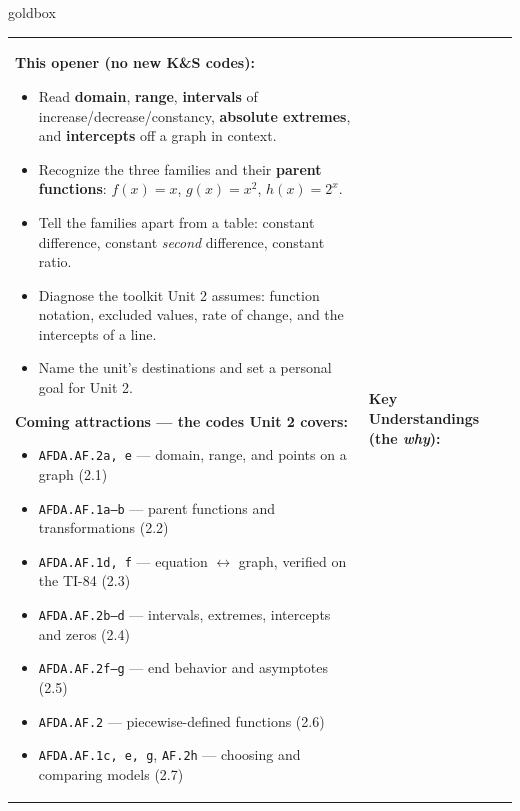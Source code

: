 \documentclass[10pt]{article}
\begin{document}
\renewcommand{\arraystretch}{1.6}
\begin{skillbox}{goldbox}
\begin{tabularx}{\linewidth}{@{}X|X@{}}
\begin{minipage}[t]{\linewidth}\vspace{0pt}
\textbf{This opener (no new K\&S codes):}
\begin{itemize}[leftmargin=1.1em, itemsep=2pt, topsep=2pt]
  \item Read \textbf{domain}, \textbf{range}, \textbf{intervals} of increase/decrease/constancy,
        \textbf{absolute extremes}, and \textbf{intercepts} off a graph in context.
  \item Recognize the three families and their \textbf{parent functions}: $f(x)=x$, $g(x)=x^2$,
        $h(x)=2^x$.
  \item Tell the families apart from a table: constant difference, constant \emph{second}
        difference, constant ratio.
  \item Diagnose the toolkit Unit 2 assumes: function notation, excluded values, rate of change,
        and the intercepts of a line.
  \item Name the unit's destinations and set a personal goal for Unit 2.
\end{itemize}
\textbf{Coming attractions --- the codes Unit 2 covers:}
\begin{itemize}[leftmargin=1.1em, itemsep=2pt, topsep=2pt]
  \item \texttt{AFDA.AF.2a, e} --- domain, range, and points on a graph (2.1)
  \item \texttt{AFDA.AF.1a--b} --- parent functions and transformations (2.2)
  \item \texttt{AFDA.AF.1d, f} --- equation $\leftrightarrow$ graph, verified on the TI-84 (2.3)
  \item \texttt{AFDA.AF.2b--d} --- intervals, extremes, intercepts and zeros (2.4)
  \item \texttt{AFDA.AF.2f--g} --- end behavior and asymptotes (2.5)
  \item \texttt{AFDA.AF.2} --- piecewise-defined functions (2.6)
  \item \texttt{AFDA.AF.1c, e, g}, \texttt{AF.2h} --- choosing and comparing models (2.7)
\end{itemize}
\end{minipage}
&
\begin{minipage}[t]{\linewidth}\vspace{0pt}
\textbf{Key Understandings (the \emph{why}):}

\end{minipage}
\end{tabularx}
\end{skillbox}
\end{document}
